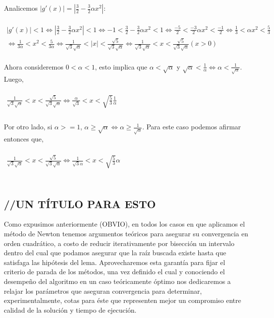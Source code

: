   Analicemos $|g'(x)| = |\frac{3}{2} - \frac{3}{2}\alpha x^2|$:\\\\
  $\begin{array}{l}
	 |g'(x)| < 1 \Leftrightarrow |\frac{3}{2} - \frac{3}{2}\alpha x^2| < 1 \Leftrightarrow -1 < \frac{3}{2} - \frac{3}{2}\alpha x^2 < 1
	 \Leftrightarrow \frac{-5}{2} < \frac{-3}{2}\alpha x^2 < \frac{-1}{2} \Leftrightarrow
	 \frac{1}{3} < \alpha x^2 < \frac{5}{3} \\
	 \Leftrightarrow \frac{1}{3\alpha} < x^2 < \frac{5}{3\alpha} \Leftrightarrow
	 \frac{1}{\sqrt{3}\sqrt{\alpha}} < |x| < \frac{\sqrt{5}}{\sqrt{3}\sqrt{\alpha}} \Leftrightarrow \frac{1}{\sqrt{3}\sqrt{\alpha}} < x < \frac{\sqrt{5}}{\sqrt{3}\sqrt{\alpha}} (x > 0)
  \end{array}$\\\\
  Ahora consideremos $0 < \alpha < 1$, esto implica que $\alpha < \sqrt{\alpha}$ y $\sqrt{\alpha} < \frac{1}{\alpha} \Leftrightarrow \alpha < \frac{1}{\sqrt{\alpha}}$.\\
  Luego, \\\\
	  $\begin{array}{l}
	      \frac{1}{\sqrt{3}\sqrt{\alpha}} < x < \frac{\sqrt{5}}{\sqrt{3}\sqrt{\alpha}} \Leftrightarrow \frac{\alpha}{\sqrt{3}} < x < \sqrt{\frac{5}{3}}\frac{1}{\alpha} \\
	  \end{array}$ \\\\
  Por otro lado, si $\alpha >= 1$, $\alpha \geq \sqrt{\alpha} \Leftrightarrow \alpha \geq \frac{1}{\sqrt{\alpha}}$. Para este caso podemos afirmar entonces que, \\\\
	  $\begin{array}{l}
	      \frac{1}{\sqrt{3}\sqrt{\alpha}} < x < \frac{\sqrt{5}}{\sqrt{3}\sqrt{\alpha}} \Leftrightarrow \frac{1}{\sqrt{3}\alpha} < x < \sqrt{\frac{5}{3}}\alpha \\
	  \end{array}$ \\\\

\subsection{//UN TÍTULO PARA ESTO}
	
Como expusimos anteriormente (OBVIO), en todos los casos en que aplicamos el método de Newton tenemos argumentos teóricos para asegurar su convergencia en orden cuadrático, a costo de reducir iterativamente por bisección un intervalo dentro del cual que podamos asegurar que la raíz buscada existe hasta que satisfaga las hipótesis del lema. Aprovecharemos esta garantía para fijar el criterio de parada de los métodos, una vez definido el cual y conociendo el desempeño del algoritmo en un caso teóricamente óptimo nos dedicaremos a relajar los parámetros que aseguran convergencia para determinar, experimentalmente, cotas para éste que representen mejor un compromiso entre calidad de la solución y tiempo de ejecución.


